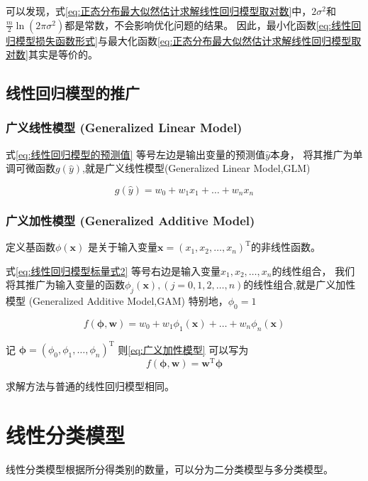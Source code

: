 \documentclass[withoutpreface,bwprint]{NoteBook}
\begin{document}
可以发现，式\cref{eq:正态分布最大似然估计求解线性回归模型取对数}中，$2\sigma^2$和$\frac{m}{2} \ln{(2\pi\sigma^2)}$都是常数，不会影响优化问题的结果。
因此，最小化函数\cref{eq:线性回归模型损失函数形式}与最大化函数\cref{eq:正态分布最大似然估计求解线性回归模型取对数}其实是等价的。


\subsection{线性回归模型的推广}
\subsubsection{广义线性模型 (Generalized Linear Model)}
式\cref{eq:线性回归模型的预测值} 等号左边是输出变量的预测值$\hat{y}$本身，
将其推广为单调可微函数$g(\hat{y})$,就是广义线性模型(Generalized Linear Model,GLM)

\begin{equation}
    \label{eq:广义线性模型}  %
    g(\hat{y}) = w_0 + w_1 x_1 + \dots + w_n x_n 
\end{equation}

\subsubsection{广义加性模型 (Generalized Additive Model)}
定义基函数$\phi (\mathbf{x})$ 是关于输入变量$\mathbf{x}=(x_1, x_2, \dots, x_n)^\mathrm{T} $的非线性函数。

式\cref{eq:线性回归模型标量式2} 等号右边是输入变量$x_1, x_2, \dots, x_n$的线性组合，
我们将其推广为输入变量的函数$\phi_j(\mathbf{x}),(j=0,1,2,\dots,n)$的线性组合,就是广义加性模型 (Generalized Additive Model,GAM)
特别地，$\phi_0=1$

\begin{equation}
    \label{eq:广义加性模型}  %
    f(\bm{\phi},\mathbf{w}) = w_0 + w_1 \phi_1(\mathbf{x}) + \dots + w_n \phi_n(\mathbf{x}) 
\end{equation}

记 
$
\bm{\phi}=(\phi_0, \phi_1, \dots, \phi_n)^\mathrm{T}
$
则\cref{eq:广义加性模型} 可以写为
\begin{equation}
    \label{eq:广义加性模型矩阵形式}  %
    f(\bm{\phi},\mathbf{w}) = \mathbf{w}^\mathrm{T} \bm{\phi}
\end{equation}

求解方法与普通的线性回归模型相同。

\section{线性分类模型}
线性分类模型根据所分得类别的数量，可以分为二分类模型与多分类模型。
\end{document}
